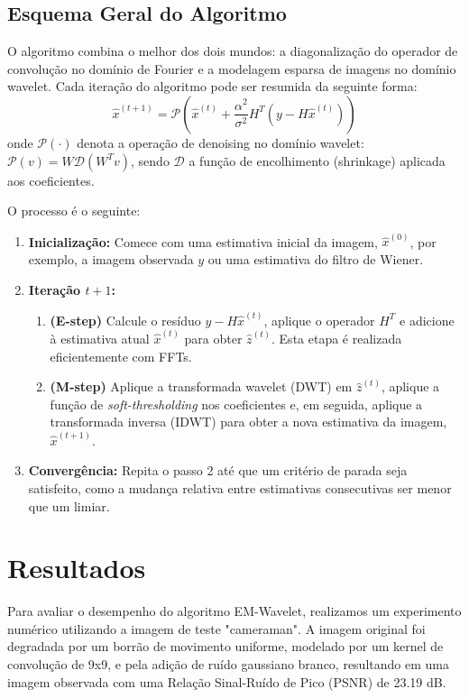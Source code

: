 \documentclass[12pt]{article}
\begin{document}
\subsection{Esquema Geral do Algoritmo}
O algoritmo combina o melhor dos dois mundos: a diagonalização do operador de convolução no domínio de Fourier e a modelagem esparsa de imagens no domínio wavelet. Cada iteração do algoritmo pode ser resumida da seguinte forma:
\[
\hat{x}^{(t+1)} = \mathcal{P}\left(\hat{x}^{(t)} + \frac{\alpha^2}{\sigma^2}H^T(y - H\hat{x}^{(t)})\right)
\]
onde $\mathcal{P}(\cdot)$ denota a operação de denoising no domínio wavelet: $\mathcal{P}(v) = W \mathcal{D}(W^T v)$, sendo $\mathcal{D}$ a função de encolhimento (shrinkage) aplicada aos coeficientes.

O processo é o seguinte:
\begin{enumerate}
    \item \textbf{Inicialização:} Comece com uma estimativa inicial da imagem, $\hat{x}^{(0)}$, por exemplo, a imagem observada $y$ ou uma estimativa do filtro de Wiener.
    \item \textbf{Iteração $t+1$:}
    \begin{enumerate}
        \item \textbf{(E-step)} Calcule o resíduo $y - H\hat{x}^{(t)}$, aplique o operador $H^T$ e adicione à estimativa atual $\hat{x}^{(t)}$ para obter $\hat{z}^{(t)}$. Esta etapa é realizada eficientemente com FFTs.
        \item \textbf{(M-step)} Aplique a transformada wavelet (DWT) em $\hat{z}^{(t)}$, aplique a função de \textit{soft-thresholding} nos coeficientes e, em seguida, aplique a transformada inversa (IDWT) para obter a nova estimativa da imagem, $\hat{x}^{(t+1)}$.
    \end{enumerate}
    \item \textbf{Convergência:} Repita o passo 2 até que um critério de parada seja satisfeito, como a mudança relativa entre estimativas consecutivas ser menor que um limiar.
\end{enumerate}

\section{Resultados}

Para avaliar o desempenho do algoritmo EM-Wavelet, realizamos um experimento numérico utilizando a imagem de teste "cameraman". A imagem original foi degradada por um borrão de movimento uniforme, modelado por um kernel de convolução de 9x9, e pela adição de ruído gaussiano branco, resultando em uma imagem observada com uma Relação Sinal-Ruído de Pico (PSNR) de 23.19 dB.
\end{document}
